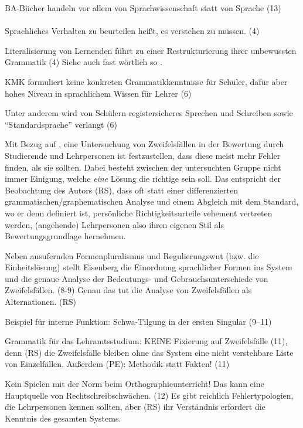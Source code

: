BA-Bücher handeln vor allem von Sprachwissenschaft statt von Sprache (13)

\paragraph*{\citet{Eisenberg2004}}

Sprachliches Verhalten zu beurteilen heißt, es verstehen zu müssen. (4)

Literalisierung von Lernenden führt zu einer Restrukturierung ihrer unbewussten Grammatik (4) Siehe auch fast wörtlich so \citet[78]{Portmanntselikas2011}.

KMK formuliert keine konkreten Grammatikkenntnisse für Schüler, dafür aber hohes Niveau in sprachlichem Wissen für Lehrer (6)

Unter anderem wird von Schülern registersicheres Sprechen und Schreiben sowie "`Standardsprache"' verlangt (6)

Mit Bezug auf \citet{Braun1979}, eine Untersuchung von Zweifelsfällen in der Bewertung durch Studierende und Lehrpersonen ist festzustellen, dass diese meist mehr Fehler finden, als sie sollten.
Dabei besteht zwischen der untersuchten Gruppe nicht immer Einigung, welche \textit{eine} Lösung die richtige sein soll.
Das entspricht der Beobachtung des Autors (RS), dass oft statt einer differenzierten grammatischen\slash graphematischen Analyse und einem Abgleich mit dem Standard, wo er denn definiert ist, persönliche Richtigkeitsurteile vehement vertreten werden, (angehende) Lehrpersonen also ihren eigenen Stil als Bewertungsgrundlage hernehmen.

Neben ausufernden Formenpluralismus und Regulierungswut (bzw. die Einheitslösung) stellt Eisenberg die Einordnung sprachlicher Formen ins System und die genaue Analyse der Bedeutungs- und Gebrauchsunterschiede von Zweifelsfällen. (8-9) Genau das tut die Analyse von Zweifelsfällen als Alternationen. (RS)

Beispiel für interne Funktion: Schwa-Tilgung in der ersten Singular (9--11)

Grammatik für das Lehramtsstudium: KEINE Fixierung auf Zweifelsfälle (11), denn (RS) die Zweifelsfälle bleiben ohne das System eine nicht verstehbare Liste von Einzelfällen. Außerdem (PE): Methodik statt Fakten! (11)

Kein Spielen mit der Norm beim Orthographieunterricht! Das kann eine Hauptquelle von Rechtschreibschwächen. (12) Es gibt reichlich Fehlertypologien, die Lehrpersonen kennen sollten, aber (RS) ihr Verständnis erfordert die Kenntnis des gesamten Systems.

